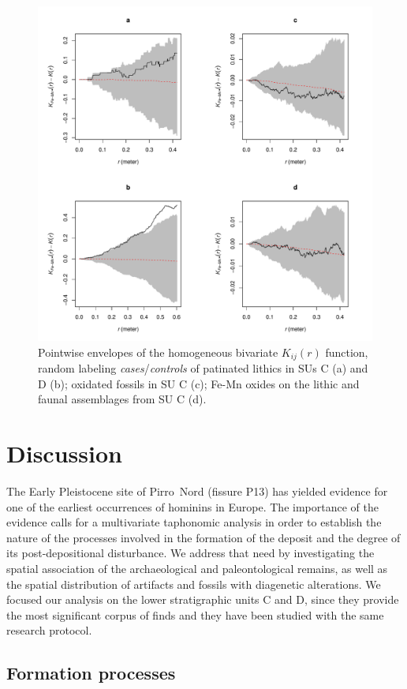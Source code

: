 \documentclass[5p,authoryear]{elsarticle} %
\begin{document}
\begin{figure}[t]
  \centering
  \includegraphics[width=.8\textwidth]{../artwork/Fig9.pdf}
  \caption{Pointwise envelopes of the homogeneous bivariate $K_{ij}(r)$ function, random labeling \emph{cases}/\emph{controls} of patinated lithics in SUs C (a) and D (b); oxidated fossils in SU C (c); Fe-Mn oxides on the lithic and faunal assemblages from SU C (d).}
  \label{fig:9}
\end{figure}

\section{Discussion}

The Early Pleistocene site of Pirro~Nord (fissure P13) has yielded evidence for one of the earliest occurrences of hominins in Europe. The importance of the evidence calls for a multivariate taphonomic analysis in order to establish the nature of the processes involved in the formation of the deposit and the degree of its post-depositional disturbance. We address that need by investigating the spatial association of the archaeological and paleontological remains, as well as the spatial distribution of artifacts and fossils with diagenetic alterations. We focused our analysis on the lower stratigraphic units C and D, since they provide the most significant corpus of finds and they have been studied with the same research protocol.

\subsection{Formation processes}
\end{document}
